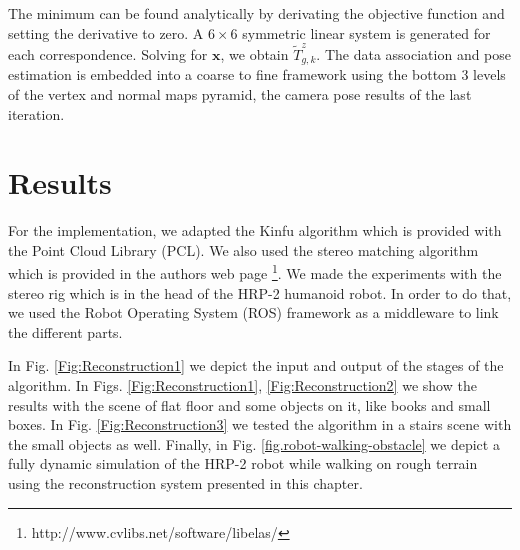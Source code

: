 The minimum can be found analytically by derivating the objective function and setting the derivative to zero. A $6 \times 6$ symmetric linear system is generated for each correspondence. Solving for $\mathbf{x}$, we obtain $\tilde{T}^z_{g,k}$.
The data association and pose estimation is embedded into a coarse to fine framework using the bottom 3 levels of the vertex and normal maps pyramid, the camera pose results of the last iteration.

\section{Results}

For the implementation, we adapted the Kinfu algorithm which is provided with the Point Cloud Library (PCL). We also used the stereo matching algorithm which is provided in the authors web page \footnote{http://www.cvlibs.net/software/libelas/}. We made the experiments with the stereo rig which is in the head of the HRP-2 humanoid robot. In order to do that, we used the Robot Operating System (ROS) framework as a middleware to link the different parts.

In Fig. \ref{Fig:Reconstruction1} we depict the input and output of the stages of the algorithm. In Figs. \ref{Fig:Reconstruction1}, \ref{Fig:Reconstruction2} we show the results with the scene of flat floor and some objects on it, like books and small boxes. In Fig. \ref{Fig:Reconstruction3} we tested the algorithm in a stairs scene with the small objects as well. Finally, in Fig. \ref{fig.robot-walking-obstacle} we depict a fully dynamic simulation of the HRP-2 robot while walking on rough terrain using the reconstruction system presented in this chapter.

